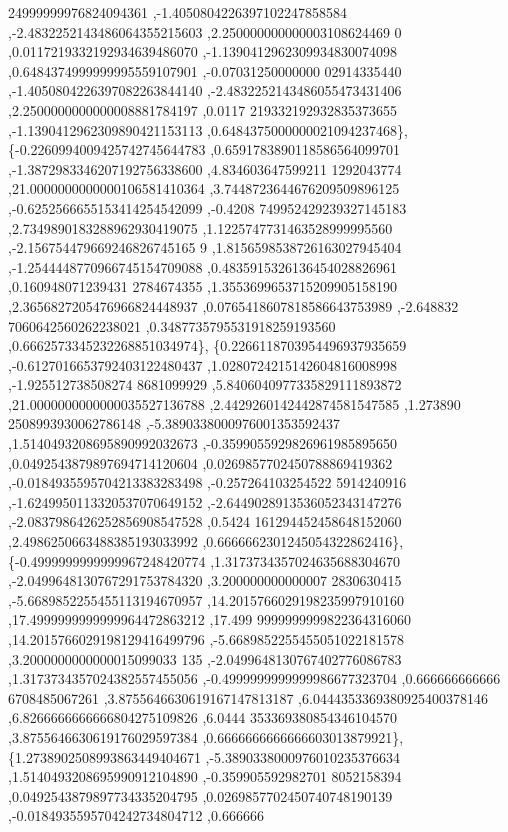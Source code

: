 \begin{DoxyCode}
      24999999976824094361 ,-1.4050804226397102247858584 ,-2.4832252143486064355215603 ,2.250000000000003108624469
      0 ,0.0117219332192934639486070 ,-1.1390412962309934830074098 ,0.6484374999999995559107901 ,-0.07031250000000
      02914335440 ,-1.4050804226397082263844140 ,-2.4832252143486055473431406 ,2.2500000000000008881784197 ,0.0117
      219332192932835373655 ,-1.1390412962309890421153113 ,0.6484375000000021094237468\},
\{-0.2260994009425742745644783 ,0.6591783890118586564099701 ,-1.3872983346207192756338600 ,4.834603647599211
      1292043774 ,21.0000000000000106581410364 ,3.7448723644676209509896125 ,-0.6252566655153414254542099 ,-0.4208
      749952429239327145183 ,2.7349890183288962930419075 ,1.1225747731463528999995560 ,-2.156754479669246826745165
      9 ,1.8156598538726163027945404 ,-1.2544448770966745154709088 ,0.4835915326136454028826961 ,0.160948071239431
      2784674355 ,1.3553699653715209905158190 ,2.3656827205476966824448937 ,0.0765418607818586643753989 ,-2.648832
      7060642560262238021 ,0.3487735795531918259193560 ,0.6662573345232268851034974\},
\{0.2266118703954496937935659 ,-0.6127016653792403122480437 ,1.0280724215142604816008998 ,-1.925512738508274
      8681099929 ,5.8406040977335829111893872 ,21.0000000000000035527136788 ,2.4429260142442874581547585 ,1.273890
      2508993930062786148 ,-5.3890338000976001353592437 ,1.5140493208695890992032673 ,-0.3599055929826961985895650
       ,0.0492543879897694714120604 ,0.0269857702450788869419362 ,-0.0184935595704213383283498 ,-0.257264103254522
      5914240916 ,-1.6249950113320537070649152 ,-2.6449028913536052343147276 ,-2.0837986426252856908547528 ,0.5424
      161294452458648152060 ,2.4986250663488385193033992 ,0.6666662301245054322862416\},
\{-0.4999999999999967248420774 ,1.3173734357024635688304670 ,-2.0499648130767291753784320 ,3.200000000000007
      2830630415 ,-5.6689852255455113194670957 ,14.2015766029198235997910160 ,17.4999999999999964472863212 ,17.499
      9999999999822364316060 ,14.2015766029198129416499796 ,-5.6689852255455051022181578 ,3.2000000000000015099033
      135 ,-2.0499648130767402776086783 ,1.3173734357024382557455056 ,-0.4999999999999986677323704 ,0.666666666666
      6708485067261 ,3.8755646630619167147813187 ,6.0444353369380925400378146 ,6.8266666666666804275109826 ,6.0444
      353369380854346104570 ,3.8755646630619176029597384 ,0.6666666666666603013879921\},
\{1.2738902508993863449404671 ,-5.3890338000976010235376634 ,1.5140493208695990912104890 ,-0.359905592982701
      8052158394 ,0.0492543879897734335204795 ,0.0269857702450740748190139 ,-0.0184935595704242734804712 ,0.666666

\end{DoxyCode}
